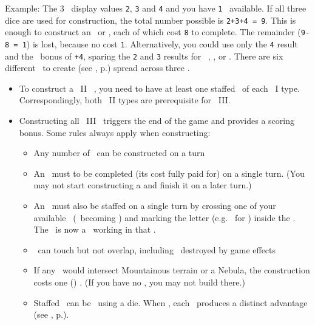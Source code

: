 Example: The 3 \whitedice\ display values \texttt{2}, \texttt{3} and \texttt{4} and you have \texttt{1} \greatperson\ available.  
If all three dice are used for construction, the total number possible is \texttt{2+3+4 = 9}.  
This is enough to construct an \academy\ or \factory, each of which cost \texttt{8} to complete.  
The remainder (\texttt{9-8 = 1}) is lost, because no \armaments cost \texttt{1}. 
Alternatively, you could use only the \texttt{4} result and the \greatperson\ bonus of \texttt{+4}, sparing the \texttt{2} and \texttt{3} results for \activating\ \armaments, \trade, or \culture.
\newline\newline
There are six different \armaments\ to create (see , p.\pageref{sec:armaments}) spread across three \levels.
\begin{itemize}
	\item To construct a \level\ II \armament\ , you need to have at least one staffed \armament\ of each \level\ I type.  Correspondingly, both \level\ II types are prerequisite for \level\ III.
	\item Constructing all \level\ III \armaments\ triggers the end of the game and provides a scoring bonus.  Some rules always apply when constructing:
  \begin{itemize}
    \item Any number of \armaments\ can be constructed on a turn
    \item An \armament\ must to be completed (its cost fully paid for) on a single turn. (You may not start constructing a \armament and finish it on a later turn.)
    \item An \armament\ must also be staffed on a single turn by crossing one of your available \astronauts\ (\gainastronautsymbol\ becoming \useastronautsymbol) and marking the letter (e.g. \academysymbol\ for \academy) inside the \armament. The \astronaut\ is now a \specialist\ working in that \armament.
    \item \armaments\ can touch but not overlap, including \armaments\ destroyed by game effects
    \item If any \armaments\ would intersect Mountainous terrain or a Nebula, the construction costs one (\spendcurrency) \currency. (If you have no \currency, you may not build there.)
		\item Staffed \armaments\ can be \activated\ using a die.  When \activated, each \armament\ produces a distinct advantage (see , p.\pageref{sec:armaments}).

\end{itemize}
\end{itemize}
